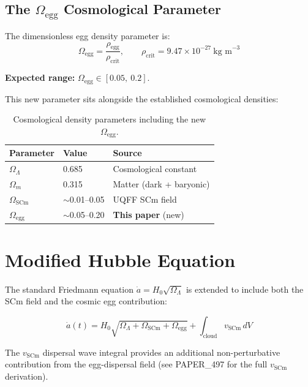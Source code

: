 \documentclass[12pt]{article}
\begin{document}
\subsection{The $\Omega_\text{egg}$ Cosmological Parameter}

The dimensionless egg density parameter is:
\begin{equation}
    \Omega_\text{egg} = \frac{\rho_\text{egg}}{\rho_\text{crit}},
    \qquad \rho_\text{crit} = 9.47 \times 10^{-27}\ \text{kg m}^{-3}
    \label{eq:Omega_egg}
\end{equation}

\noindent\textbf{Expected range:} $\Omega_\text{egg} \in [0.05,\ 0.2]$.

This new parameter sits alongside the established cosmological densities:

\begin{table}[h]
\centering
\begin{tabular}{lll}
\toprule
Parameter & Value & Source \\
\midrule
$\Omega_\Lambda$ & 0.685 & Cosmological constant \\
$\Omega_m$ & 0.315 & Matter (dark + baryonic) \\
$\Omega_\text{SCm}$ & $\sim$0.01--0.05 & UQFF SCm field \\
$\Omega_\text{egg}$ & $\sim$0.05--0.20 & \textbf{This paper} (new) \\
\bottomrule
\end{tabular}
\caption{Cosmological density parameters including the new $\Omega_\text{egg}$.}
\end{table}

\section{Modified Hubble Equation}

The standard Friedmann equation $\dot{a} = H_0\sqrt{\Omega_\Lambda}$ is
extended to include both the SCm field and the cosmic egg contribution:

\begin{equation}
    \boxed{
    \dot{a}(t) = H_0 \sqrt{\Omega_\Lambda + \Omega_\text{SCm} + \Omega_\text{egg}}
    + \int_\text{cloud} v_\text{SCm}\, dV
    }
    \label{eq:hubble_modified}
\end{equation}

The $v_\text{SCm}$ dispersal wave integral provides an additional
non-perturbative contribution from the egg-dispersal field
(see PAPER\_497 for the full $v_\text{SCm}$ derivation).
\end{document}
